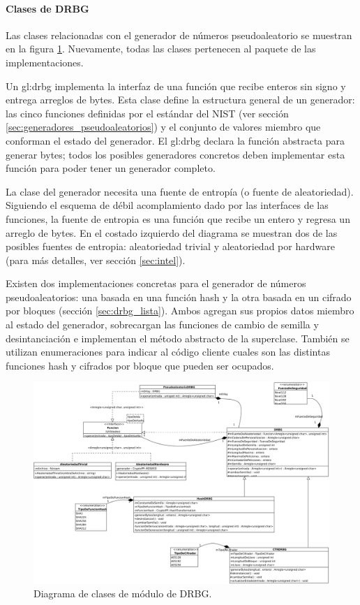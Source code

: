 %
%
%

\paragraph{Clases de DRBG}
\label{sec:drbg_disenio}

Las clases relacionadas con el generador de números pseudoaleatorio se muestran
en la figura \ref{clases_drbg}. Nuevamente, todas las clases pertenecen al
paquete de las implementaciones.

Un \gls{gl:drbg} implementa la interfaz de una función que recibe enteros sin
signo y entrega arreglos de bytes. Esta clase define la estructura general de un
generador: las cinco funciones definidas por el estándar del NIST (ver sección
\ref{sec:generadores_pseudoaleatorios}) y el conjunto de valores miembro que
conforman el estado del generador. El \gls{gl:drbg} declara la función abstracta
para generar bytes; todos los posibles generadores concretos deben implementar
esta función para poder tener un generador completo.

La clase del generador necesita una fuente de entropía (o fuente de
aleatoriedad). Siguiendo el esquema de débil acomplamiento dado por las
interfaces de las funciones, la fuente de entropia es una función que recibe un
entero y regresa un arreglo de bytes. En el costado izquierdo del diagrama se
muestran dos de las posibles fuentes de entropia: aleatoriedad trivial y
aleatoriedad por hardware (para más detalles, ver sección \ref{sec:intel}).

Existen dos implementaciones concretas para el generador de números
pseudoaleatorios: una basada en una función hash y la otra basada en un cifrado
por bloques (sección \ref{sec:drbg_lista}). Ambos agregan sus propios datos
miembro al estado del generador, sobrecargan las funciones de cambio de semilla
y desintanciación e implementan el método abstracto de la superclase. También se
utilizan enumeraciones para indicar al código cliente cuales son las distintas
funciones hash y cifrados por bloque que pueden ser ocupados.

\begin{figure}
  \begin{center}
    \includegraphics[width=0.8\linewidth]{diagramas/drbg.png}
    \caption{Diagrama de clases de módulo de DRBG.}
    \label{clases_drbg}
  \end{center}
\end{figure}
